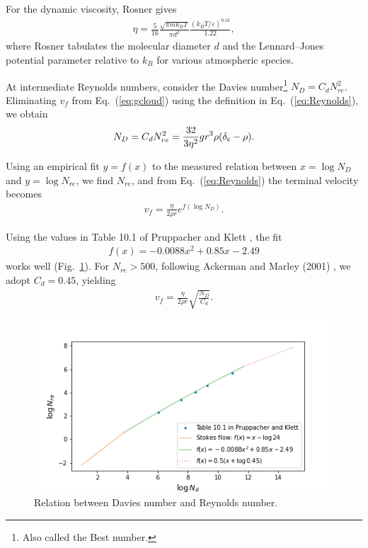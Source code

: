 For the dynamic viscosity, Rosner \cite{rosner2012transport} gives
\begin{align}
\label{eq:dyvis}
\eta = \frac{5}{16} \frac{\sqrt{\pi m k_B T}}{\pi d^2} \frac{(k_B T/\varepsilon)^{0.16}}{1.22},
\end{align}
where Rosner \cite{rosner2012transport} tabulates the molecular diameter $d$ and the Lennard–Jones potential parameter relative to $k_B$ for various atmospheric species.

At intermediate Reynolds numbers, consider the Davies number\footnote{Also called the Best number.} $N_D = C_d N_{re}^2$.  
Eliminating $v_f$ from Eq.~(\ref{eq:gcloud}) using the definition in Eq.~(\ref{eq:Reynolds}), we obtain
\begin{align}
\label{eq:davies}
N_D = C_d N_{re}^2 = \frac{32}{3 \eta^2} g r^3 \rho (\delta_{\mathsf{c}} - \rho).
\end{align}

Using an empirical fit $y=f(x)$ to the measured relation between $x=\log{N_D}$ and $y=\log{N_{re}}$, we find $N_{re}$, and from Eq.~(\ref{eq:Reynolds}) the terminal velocity becomes
\begin{align}
\label{eq:vfmid}
v_f = \frac{\eta}{2 \rho r} e^{f(\log{N_D})}.
\end{align}

Using the values in Table 10.1 of Pruppacher and Klett \cite{pruppacher2010microstructure}, the fit
\begin{align}
\label{eq:daviesn}
f(x) = -0.0088 x^2 + 0.85 x - 2.49
\end{align}
works well (Fig.~\ref{fig:davies}).  
For $N_{re}>500$, following Ackerman and Marley (2001) \cite{ackerman2001precipitating}, we adopt $C_d=0.45$, yielding
\begin{align}
\label{eq:vflarge}
v_f = \frac{\eta}{2 \rho r} \sqrt{\frac{N_D}{C_d}}.
\end{align}

\begin{figure}[htb]
\begin{center}
\includegraphics[width=\linewidth]{fig/clouds/davies_reynolds.png}
\caption{Relation between Davies number and Reynolds number.\label{fig:davies}}
\end{center}
\end{figure}

